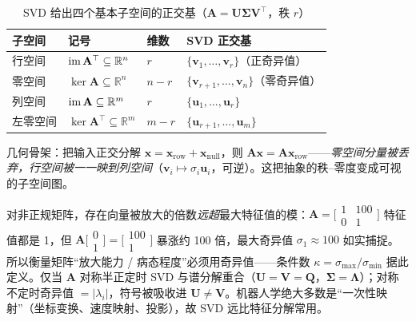 \begin{table}[H]\centering\small
\caption{SVD 给出四个基本子空间的正交基（$\mathbf{A}=\mathbf{U}\boldsymbol{\Sigma}\mathbf{V}^\top$，秩 $r$）}
\begin{tabular}{llll}
\toprule
子空间 & 记号 & 维数 & SVD 正交基 \\
\midrule
行空间 & $\operatorname{im}\mathbf{A}^\top\subseteq\mathbb{R}^n$ & $r$ & $\{\mathbf{v}_1,\dots,\mathbf{v}_r\}$（正奇异值） \\
零空间 & $\ker\mathbf{A}\subseteq\mathbb{R}^n$ & $n-r$ & $\{\mathbf{v}_{r+1},\dots,\mathbf{v}_n\}$（零奇异值） \\
列空间 & $\operatorname{im}\mathbf{A}\subseteq\mathbb{R}^m$ & $r$ & $\{\mathbf{u}_1,\dots,\mathbf{u}_r\}$ \\
左零空间 & $\ker\mathbf{A}^\top\subseteq\mathbb{R}^m$ & $m-r$ & $\{\mathbf{u}_{r+1},\dots,\mathbf{u}_m\}$ \\
\bottomrule
\end{tabular}
\end{table}

\noindent 几何骨架：把输入正交分解 $\mathbf{x}=\mathbf{x}_{\mathrm{row}}+\mathbf{x}_{\mathrm{null}}$，则 $\mathbf{A}\mathbf{x}=\mathbf{A}\mathbf{x}_{\mathrm{row}}$——\emph{零空间分量被丢弃，行空间被一一映到列空间}（$\mathbf{v}_i\mapsto\sigma_i\mathbf{u}_i$，可逆）。这把抽象的秩--零度变成可视的子空间图。

\begin{insight}
对非正规矩阵，存在向量被放大的倍数\emph{远超}最大特征值的模：$\mathbf{A}=\bigl[\begin{smallmatrix}1&100\\0&1\end{smallmatrix}\bigr]$ 特征值都是 1，但 $\mathbf{A}\bigl[\begin{smallmatrix}0\\1\end{smallmatrix}\bigr]=\bigl[\begin{smallmatrix}100\\1\end{smallmatrix}\bigr]$ 暴涨约 100 倍，最大奇异值 $\sigma_1\approx100$ 如实捕捉。所以衡量矩阵“放大能力 / 病态程度”必须用奇异值——条件数 $\kappa=\sigma_{\max}/\sigma_{\min}$ 据此定义。仅当 $\mathbf{A}$ 对称半正定时 SVD 与谱分解重合（$\mathbf{U}=\mathbf{V}=\mathbf{Q}$，$\boldsymbol{\Sigma}=\boldsymbol{\Lambda}$）；对称不定时奇异值 $=|\lambda_i|$，符号被吸收进 $\mathbf{U}\neq\mathbf{V}$。机器人学绝大多数是“一次性映射”（坐标变换、速度映射、投影），故 SVD 远比特征分解常用。
\end{insight}

